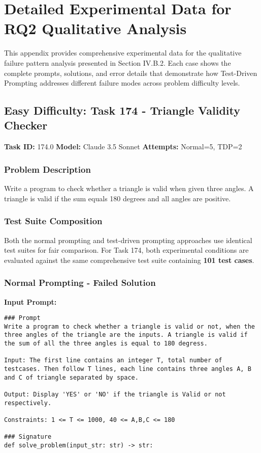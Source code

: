 \documentclass{article}
\begin{document}
\section{Detailed Experimental Data for RQ2 Qualitative Analysis}
\label{appendix:rq2_data}

This appendix provides comprehensive experimental data for the qualitative failure pattern analysis presented in Section IV.B.2. Each case shows the complete prompts, solutions, and error details that demonstrate how Test-Driven Prompting addresses different failure modes across problem difficulty levels.

\subsection{Easy Difficulty: Task 174 - Triangle Validity Checker}
\label{appendix:task174}

\noindent \textbf{Task ID:} 174.0 \quad \textbf{Model:} Claude 3.5 Sonnet \quad \textbf{Attempts:} Normal=5, TDP=2

\subsubsection{Problem Description}
Write a program to check whether a triangle is valid when given three angles. A triangle is valid if the sum equals 180 degrees and all angles are positive.

\subsubsection{Test Suite Composition}

Both the normal prompting and test-driven prompting approaches use identical test suites for fair comparison. For Task 174, both experimental conditions are evaluated against the same comprehensive test suite containing \textbf{101 test cases}.

\subsubsection{Normal Prompting - Failed Solution}

\textbf{Input Prompt:}
\begin{lstlisting}
### Prompt
Write a program to check whether a triangle is valid or not, when the three angles of the triangle are the inputs. A triangle is valid if the sum of all the three angles is equal to 180 degress.

Input: The first line contains an integer T, total number of testcases. Then follow T lines, each line contains three angles A, B and C of triangle separated by space.

Output: Display 'YES' or 'NO' if the triangle is Valid or not respectively.

Constraints: 1 <= T <= 1000, 40 <= A,B,C <= 180

### Signature
def solve_problem(input_str: str) -> str:
\end{lstlisting}
\end{document}
